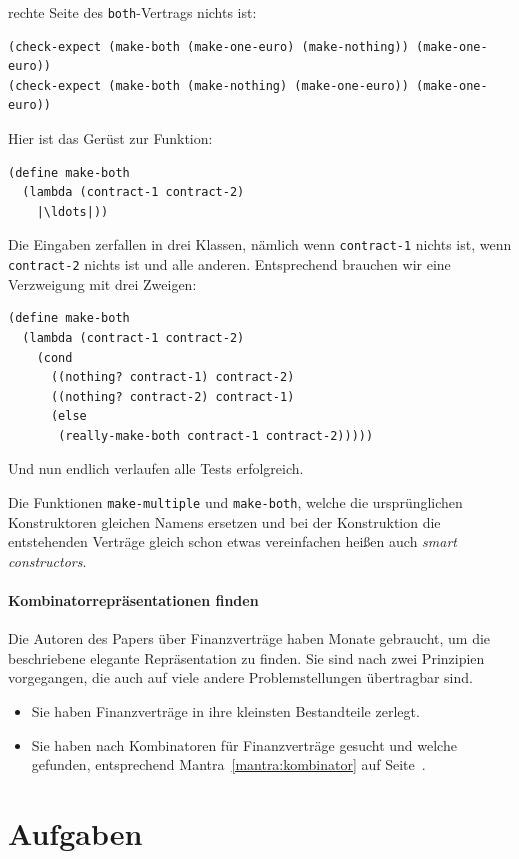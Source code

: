 rechte Seite des \lstinline{both}-Vertrags nichts ist:
%
\begin{lstlisting}
(check-expect (make-both (make-one-euro) (make-nothing)) (make-one-euro))
(check-expect (make-both (make-nothing) (make-one-euro)) (make-one-euro))
\end{lstlisting}
%
Hier ist das Gerüst zur Funktion:
%
\begin{lstlisting}
(define make-both
  (lambda (contract-1 contract-2)
    |\ldots|))
\end{lstlisting}
%
Die Eingaben zerfallen in drei Klassen, nämlich wenn
\lstinline{contract-1} nichts ist, wenn \lstinline{contract-2} nichts
ist und alle anderen.  Entsprechend brauchen wir eine Verzweigung mit
drei Zweigen:
%
\begin{lstlisting}
(define make-both
  (lambda (contract-1 contract-2)
    (cond
      ((nothing? contract-1) contract-2)
      ((nothing? contract-2) contract-1)
      (else
       (really-make-both contract-1 contract-2)))))
\end{lstlisting}
%
Und nun endlich verlaufen alle Tests erfolgreich.

Die Funktionen \lstinline{make-multiple} und \lstinline{make-both},
welche die ursprünglichen Konstruktoren gleichen Namens ersetzen und
bei der Konstruktion die entstehenden Verträge gleich schon etwas
vereinfachen heißen auch \textit{smart constructors}.

\paragraph{Kombinatorrepräsentationen finden} Die Autoren des Papers über Finanzverträge
haben Monate gebraucht, um die beschriebene elegante Repräsentation zu
finden.  Sie sind nach zwei Prinzipien vorgegangen, die auch auf viele andere Problemstellungen übertragbar sind.

%
\begin{itemize}
\item Sie haben Finanzverträge in ihre kleinsten Bestandteile zerlegt.
\item Sie haben nach Kombinatoren für Finanzverträge gesucht und
  welche gefunden, entsprechend Mantra~\ref{mantra:kombinator} auf Seite~\pageref{mantra:kombinator}.
\end{itemize}
%

\section*{Aufgaben}

